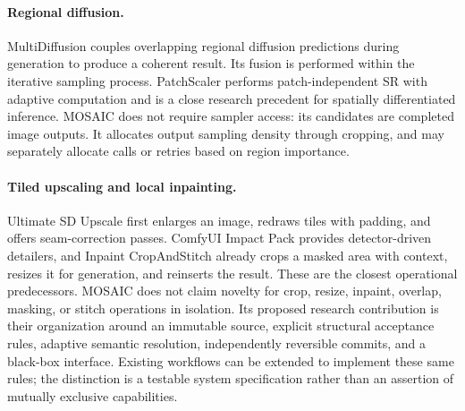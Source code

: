 \documentclass[10pt,twocolumn]{article}
\begin{document}
\paragraph{Regional diffusion.} MultiDiffusion \cite{multi} couples overlapping regional diffusion predictions during generation to produce a coherent result. Its fusion is performed within the iterative sampling process. PatchScaler \cite{patch} performs patch-independent SR with adaptive computation and is a close research precedent for spatially differentiated inference. MOSAIC does not require sampler access: its candidates are completed image outputs. It allocates output sampling density through cropping, and may separately allocate calls or retries based on region importance.
\paragraph{Tiled upscaling and local inpainting.} Ultimate SD Upscale \cite{ultimate} first enlarges an image, redraws tiles with padding, and offers seam-correction passes. ComfyUI Impact Pack \cite{impact} provides detector-driven detailers, and Inpaint CropAndStitch \cite{crop} already crops a masked area with context, resizes it for generation, and reinserts the result. These are the closest operational predecessors. MOSAIC does not claim novelty for crop, resize, inpaint, overlap, masking, or stitch operations in isolation. Its proposed research contribution is their organization around an immutable source, explicit structural acceptance rules, adaptive semantic resolution, independently reversible commits, and a black-box interface. Existing workflows can be extended to implement these same rules; the distinction is a testable system specification rather than an assertion of mutually exclusive capabilities.
\end{document}

